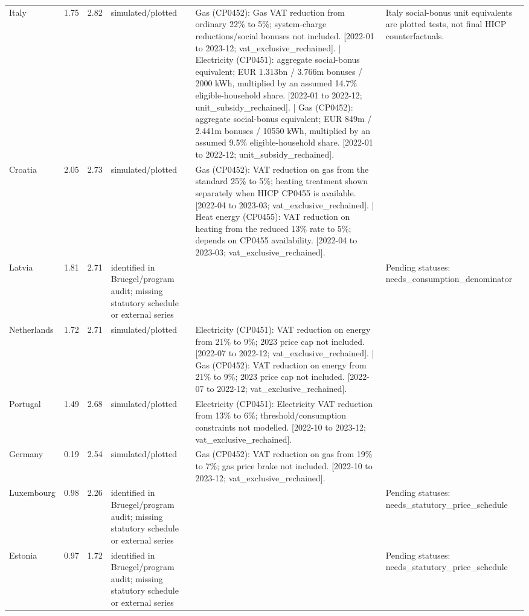 \begin{table}[H]
\begin{tabular}{lrrp{}p{}p{}}
Italy & 1.75 & 2.82 & simulated/plotted & Gas (CP0452): Gas VAT reduction from ordinary 22\% to 5\%; system-charge reductions/social bonuses not included. [2022-01 to 2023-12; vat\_exclusive\_rechained]. | Electricity (CP0451): aggregate social-bonus equivalent; EUR 1.313bn / 3.766m bonuses / 2000 kWh, multiplied by an assumed 14.7\% eligible-household share. [2022-01 to 2022-12; unit\_subsidy\_rechained]. | Gas (CP0452): aggregate social-bonus equivalent; EUR 849m / 2.441m bonuses / 10550 kWh, multiplied by an assumed 9.5\% eligible-household share. [2022-01 to 2022-12; unit\_subsidy\_rechained]. & Italy social-bonus unit equivalents are plotted tests, not final HICP counterfactuals. \\
Croatia & 2.05 & 2.73 & simulated/plotted & Gas (CP0452): VAT reduction on gas from the standard 25\% to 5\%; heating treatment shown separately when HICP CP0455 is available. [2022-04 to 2023-03; vat\_exclusive\_rechained]. | Heat energy (CP0455): VAT reduction on heating from the reduced 13\% rate to 5\%; depends on CP0455 availability. [2022-04 to 2023-03; vat\_exclusive\_rechained]. &  \\
Latvia & 1.81 & 2.71 & identified in Bruegel/program audit; missing statutory schedule or external series &  & Pending statuses: needs\_consumption\_denominator \\
Netherlands & 1.72 & 2.71 & simulated/plotted & Electricity (CP0451): VAT reduction on energy from 21\% to 9\%; 2023 price cap not included. [2022-07 to 2022-12; vat\_exclusive\_rechained]. | Gas (CP0452): VAT reduction on energy from 21\% to 9\%; 2023 price cap not included. [2022-07 to 2022-12; vat\_exclusive\_rechained]. &  \\
Portugal & 1.49 & 2.68 & simulated/plotted & Electricity (CP0451): Electricity VAT reduction from 13\% to 6\%; threshold/consumption constraints not modelled. [2022-10 to 2023-12; vat\_exclusive\_rechained]. &  \\
Germany & 0.19 & 2.54 & simulated/plotted & Gas (CP0452): VAT reduction on gas from 19\% to 7\%; gas price brake not included. [2022-10 to 2023-12; vat\_exclusive\_rechained]. &  \\
Luxembourg & 0.98 & 2.26 & identified in Bruegel/program audit; missing statutory schedule or external series &  & Pending statuses: needs\_statutory\_price\_schedule \\
Estonia & 0.97 & 1.72 & identified in Bruegel/program audit; missing statutory schedule or external series &  & Pending statuses: needs\_statutory\_price\_schedule \\

\end{tabular}
\end{table}
